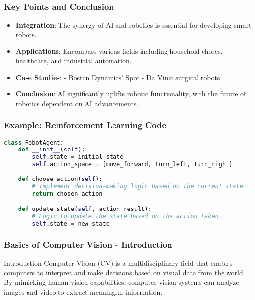 \documentclass[aspectratio=169]{beamer}
\begin{document}
\begin{frame}[fragile]
    \frametitle{Key Points and Conclusion}
    \begin{itemize}
        \item \textbf{Integration}:
            The synergy of AI and robotics is essential for developing smart robots.
        
        \item \textbf{Applications}:
            Encompass various fields including household chores, healthcare, and industrial automation.
        
        \item \textbf{Case Studies}:
            - Boston Dynamics' Spot
            - Da Vinci surgical robots
        
        \item \textbf{Conclusion}:
            AI significantly uplifts robotic functionality, with the future of robotics dependent on AI advancements.
    \end{itemize}
\end{frame}

\begin{frame}[fragile]
    \frametitle{Example: Reinforcement Learning Code}
    \begin{lstlisting}[language=Python]
class RobotAgent:
    def __init__(self):
        self.state = initial_state
        self.action_space = [move_forward, turn_left, turn_right]
    
    def choose_action(self):
        # Implement decision-making logic based on the current state
        return chosen_action

    def update_state(self, action_result):
        # Logic to update the state based on the action taken
        self.state = new_state
    \end{lstlisting}
\end{frame}

\begin{frame}[fragile]
    \frametitle{Basics of Computer Vision - Introduction}
    \begin{block}{Introduction}
        Computer Vision (CV) is a multidisciplinary field that enables computers to interpret and make decisions based on visual data from the world. By mimicking human vision capabilities, computer vision systems can analyze images and video to extract meaningful information.
    \end{block}
\end{frame}
\end{document}
